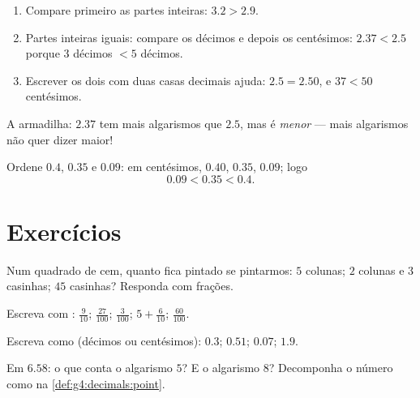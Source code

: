 \begin{method}\label{met:g4:decimals:compare}
\begin{enumerate}
  \item Compare primeiro as partes inteiras: $3.2 > 2.9$.
  \item Partes inteiras iguais: compare os décimos e depois os
        centésimos: $2.37 < 2.5$ porque $3$ décimos $< 5$ décimos.
  \item Escrever os dois com duas casas decimais ajuda:
        $2.5 = 2.50$, e $37 < 50$ centésimos.
\end{enumerate}
A armadilha: $2.37$ tem mais algarismos que $2.5$, mas é
\emph{menor} --- mais algarismos não quer dizer maior!
\end{method}

\begin{example}\label{ex:g4:decimals:compare}
Ordene $0.4$, $0.35$ e $0.09$: em centésimos, $0.40$, $0.35$,
$0.09$; logo
\[
0.09 < 0.35 < 0.4 .
\]
\end{example}

\section{Exercícios}

\begin{exercise}[$\star$]\label{exo:g4:decimals:1}
Num quadrado de cem, quanto fica pintado se pintarmos: $5$ colunas;
$2$ colunas e $3$ casinhas; $45$ casinhas? Responda com frações.
\end{exercise}

\begin{exercise}[$\star$]\label{exo:g4:decimals:2}
Escreva com :
$\frac{9}{10}$; \quad $\frac{27}{100}$; \quad $\frac{3}{100}$; \quad
$5 + \frac{6}{10}$; \quad $\frac{60}{100}$.
\end{exercise}

\begin{exercise}[$\star$]\label{exo:g4:decimals:3}
Escreva como  (décimos ou centésimos):
$0.3$; \quad $0.51$; \quad $0.07$; \quad $1.9$.
\end{exercise}

\begin{exercise}[$\star$]\label{exo:g4:decimals:4}
Em $6.58$: o que conta o algarismo $5$? E o algarismo $8$?
Decomponha o número como na \cref{def:g4:decimals:point}.
\end{exercise}

